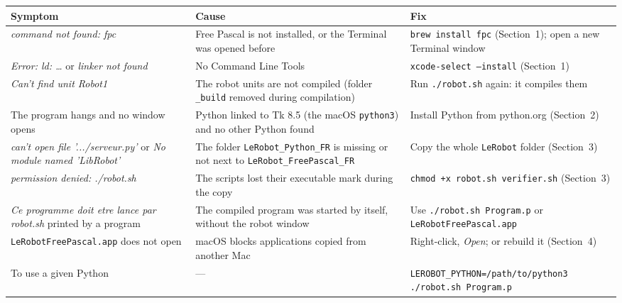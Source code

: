 \documentclass[11pt,a4paper]{article}
\newcommand{\kbd}[1]{\texttt{#1}}
\begin{document}
\begin{tabularx}{\textwidth}{@{}LLL@{}}
\toprule
\textbf{Symptom} & \textbf{Cause} & \textbf{Fix} \\
\midrule
\emph{command not found: fpc} & Free Pascal is not installed, or the Terminal was opened before & \kbd{brew install fpc} (Section~1); open a new Terminal window \\
\addlinespace
\emph{Error: ld: \dots} or \emph{linker not found} & No Command Line Tools & \kbd{xcode-select --install} (Section~1) \\
\addlinespace
\emph{Can't find unit Robot1} & The robot units are not compiled (folder \kbd{\_build} removed during compilation) & Run \kbd{./robot.sh} again: it compiles them \\
\addlinespace
The program hangs and no window opens & Python linked to Tk 8.5 (the macOS \kbd{python3}) and no other Python found & Install Python from python.org (Section~2) \\
\addlinespace
\emph{can't open file '.../serveur.py'} or \emph{No module named 'LibRobot'} & The folder \kbd{LeRobot\_Python\_FR} is missing or not next to \kbd{LeRobot\_FreePascal\_FR} & Copy the whole \kbd{LeRobot} folder (Section~3) \\
\addlinespace
\emph{permission denied: ./robot.sh} & The scripts lost their executable mark during the copy & \kbd{chmod +x robot.sh verifier.sh} (Section~3) \\
\addlinespace
\emph{Ce programme doit etre lance par robot.sh} printed by a program & The compiled program was started by itself, without the robot window & Use \kbd{./robot.sh Program.p} or \kbd{LeRobotFreePascal.app} \\
\addlinespace
\kbd{LeRobotFreePascal.app} does not open & macOS blocks applications copied from another Mac & Right-click, \emph{Open}; or rebuild it (Section~4) \\
\addlinespace
To use a given Python & --- & \kbd{LEROBOT\_PYTHON=\allowbreak /path/\allowbreak to/\allowbreak python3 \allowbreak ./robot.sh Program.p} \\
\bottomrule
\end{tabularx}
\end{document}
